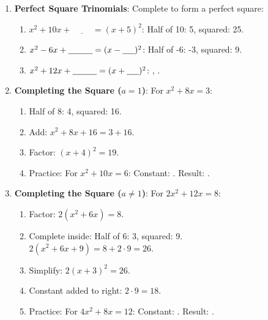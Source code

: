 \documentclass[12pt]{article}
\begin{document}
\begin{enumerate}[label=20.\arabic*]
    \item \textbf{Perfect Square Trinomials}: Complete to form a perfect square:
    \begin{enumerate}[label=\alph*)]
        \item \( x^2 + 10x + \underline{\hspace{1cm}} = (x + 5)^2 \): Half of 10: 5, squared: 25.
        \item \( x^2 - 6x + \underline{\hspace{1cm}} = (x - \underline{\hspace{0.5cm}})^2 \): Half of -6: -3, squared: 9.
        \item \( x^2 + 12x + \underline{\hspace{1cm}} = (x + \underline{\hspace{0.5cm}})^2 \): \underline{\hspace{1cm}}, \underline{\hspace{0.5cm}}.
    \end{enumerate}
    \item \textbf{Completing the Square (\( a = 1 \))}: For \( x^2 + 8x = 3 \):
    \begin{enumerate}[label=\alph*)]
        \item Half of 8: 4, squared: 16.
        \item Add: \( x^2 + 8x + 16 = 3 + 16 \).
        \item Factor: \( (x + 4)^2 = 19 \).
        \item Practice: For \( x^2 + 10x = 6 \): Constant: \underline{\hspace{1cm}}. Result: \underline{\hspace{2.5cm}}.
    \end{enumerate}
    \item \textbf{Completing the Square (\( a \neq 1 \))}: For \( 2x^2 + 12x = 8 \):
    \begin{enumerate}[label=\alph*)]
        \item Factor: \( 2(x^2 + 6x) = 8 \).
        \item Complete inside: Half of 6: 3, squared: 9. \\
        \( 2(x^2 + 6x + 9) = 8 + 2 \cdot 9 = 26 \).
        \item Simplify: \( 2(x + 3)^2 = 26 \).
        \item Constant added to right: \( 2 \cdot 9 = 18 \).
        \item Practice: For \( 4x^2 + 8x = 12 \): Constant: \underline{\hspace{1cm}}. Result: \underline{\hspace{2.5cm}}.

\end{enumerate}
\end{enumerate}
\end{document}
